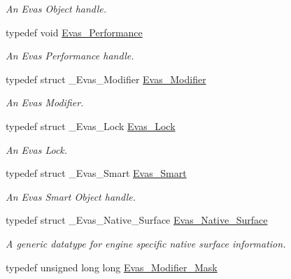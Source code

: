 \begin{DoxyCompactItemize}
\begin{DoxyCompactList}\small\item\em An Evas Object handle. \item\end{DoxyCompactList}\item 
typedef void \hyperlink{Evas_8h_a89d88a04f7684454960d465a1b9657c2}{Evas\_\-Performance}\label{Evas_8h_a89d88a04f7684454960d465a1b9657c2}

\begin{DoxyCompactList}\small\item\em An Evas Performance handle. \item\end{DoxyCompactList}\item 
typedef struct \_\-Evas\_\-Modifier \hyperlink{Evas_8h_a198d0b10861c1da456004688d3443e96}{Evas\_\-Modifier}\label{Evas_8h_a198d0b10861c1da456004688d3443e96}

\begin{DoxyCompactList}\small\item\em An Evas Modifier. \item\end{DoxyCompactList}\item 
typedef struct \_\-Evas\_\-Lock \hyperlink{Evas_8h_a791323b644ee831ead4c5d25552a0fd8}{Evas\_\-Lock}\label{Evas_8h_a791323b644ee831ead4c5d25552a0fd8}

\begin{DoxyCompactList}\small\item\em An Evas Lock. \item\end{DoxyCompactList}\item 
typedef struct \_\-Evas\_\-Smart \hyperlink{Evas_8h_a7cdfd1afece1cad64c413eb9a778ddbb}{Evas\_\-Smart}\label{Evas_8h_a7cdfd1afece1cad64c413eb9a778ddbb}

\begin{DoxyCompactList}\small\item\em An Evas Smart Object handle. \item\end{DoxyCompactList}\item 
typedef struct \_\-Evas\_\-Native\_\-Surface \hyperlink{Evas_8h_ae35ae0b7b909a9e956836b92d63b493d}{Evas\_\-Native\_\-Surface}\label{Evas_8h_ae35ae0b7b909a9e956836b92d63b493d}

\begin{DoxyCompactList}\small\item\em A generic datatype for engine specific native surface information. \item\end{DoxyCompactList}\item 
typedef unsigned long long \hyperlink{Evas_8h_a111c7333a7d49e44698bd19dd5bc9059}{Evas\_\-Modifier\_\-Mask}\label{Evas_8h_a111c7333a7d49e44698bd19dd5bc9059}


\end{DoxyCompactItemize}
